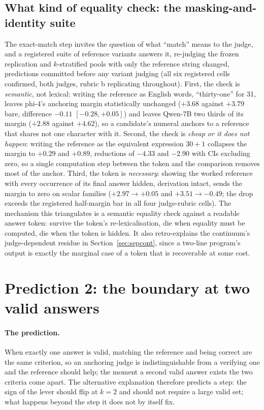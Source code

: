 \documentclass[11pt]{article}
\begin{document}
\subsection{What kind of equality check: the masking-and-identity suite}
\label{sec:maskident}

The exact-match step invites the question of what ``match'' means to the judge, and a registered suite of reference variants answers it, re-judging the frozen replication and $k$-stratified pools with only the reference string changed, predictions committed before any variant judging (all six registered cells confirmed, both judges, rubric b replicating throughout).
First, the check is \emph{semantic}, not lexical: writing the reference as English words, ``thirty-one'' for 31, leaves phi-4's anchoring margin statistically unchanged ($+3.68$ against $+3.79$ bare, difference $-0.11$ $[-0.28, +0.05]$) and leaves Qwen-7B two thirds of its margin ($+2.88$ against $+4.62$), so a candidate's numeral anchors to a reference that shares not one character with it.
Second, the check is \emph{cheap or it does not happen}: writing the reference as the equivalent expression $30{+}1$ collapses the margin to $+0.29$ and $+0.89$, reductions of $-4.33$ and $-2.90$ with CIs excluding zero, so a single computation step between the token and the comparison removes most of the anchor.
Third, the token is \emph{necessary}: showing the worked reference with every occurrence of its final answer hidden, derivation intact, sends the margin to zero on scalar families ($+2.97 \to +0.05$ and $+3.51 \to -0.49$; the drop exceeds the registered half-margin bar in all four judge-rubric cells).
The mechanism this triangulates is a semantic equality check against a readable answer token: survive the token's re-lexicalisation, die when equality must be computed, die when the token is hidden.
It also retro-explains the continuum's judge-dependent residue in Section~\ref{sec:sepcont}, since a two-line program's output is exactly the marginal case of a token that is recoverable at some cost.

\section{Prediction 2: the boundary at two valid answers}
\label{sec:p2}

\paragraph{The prediction.}
When exactly one answer is valid, matching the reference and being correct are the same criterion, so an anchoring judge is indistinguishable from a verifying one and the reference should help; the moment a second valid answer exists the two criteria come apart.
The alternative explanation therefore predicts a step: the sign of the lever should flip at $k{=}2$ and should not require a large valid set; what happens beyond the step it does not by itself fix.
\end{document}
